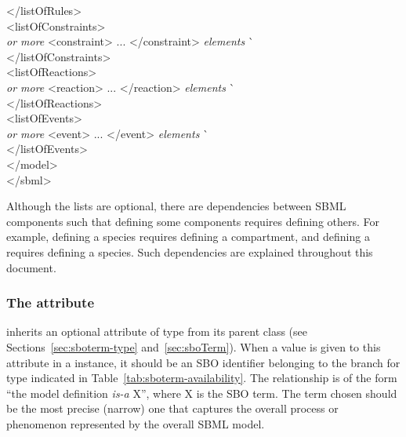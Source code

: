 \begin{tt}
\begin{tabbing}
\>\></listOfRules>\\
\>\><listOfConstraints>\\
\>\>\>\textrm{\emph{ or more}} <constraint> ... </constraint> \textrm{\emph{elements}}  \` \sayOptional\\
\>\></listOfConstraints>\\
\>\><listOfReactions>\\
\>\>\>\textrm{\emph{ or more}} <reaction> ... </reaction> \textrm{\emph{elements}}  \` \sayOptional\\
\>\></listOfReactions>\\
\>\><listOfEvents>\\
\>\>\>\textrm{\emph{ or more}} <event> ... </event> \textrm{\emph{elements}}  \` \sayOptional\\
\>\></listOfEvents>\\
\></model>\\
</sbml>
\end{tabbing}
\regularspacing
\end{tt}
\vspace*{0.5ex}

Although the lists are optional, there are dependencies between
SBML components such that defining some components requires
defining others.  For example, defining a species requires
defining a compartment, and defining a  requires defining
a species.  Such dependencies are explained throughout this
document.
  




\subsubsection{The  attribute}
\label{sec:model-sboterm}

\Model inherits an optional  attribute of type
 from its parent class \SBase (see
Sections~\ref{sec:sboterm-type} and~\ref{sec:sboTerm}).  When a
value is given to this attribute in a \Model instance, it should
be an SBO identifier belonging to the branch for type \Model
indicated in Table~\ref{tab:sboterm-availability}.  The
  relationship is of the form ``the model definition \emph{is-a}
  X'', where X is the SBO term.  The term chosen should be the
most precise (narrow) one that captures the overall process or
phenomenon represented by the overall SBML model.

